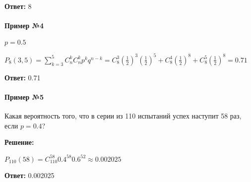 \documentclass{article}
\begin{document}
\textbf{Ответ:} 8

\paragraph{Пример №4}

$p = 0.5$

$P_{8}(3, 5) = \sum\limits_{k = 3}^{5} C_{n}^{k} C_{n}^{k} p^{k} q^{n - k} = C_{8}^{3} (\frac{1}{2})^{3} (\frac{1}{2})^{5} + C_{8}^{4} (\frac{1}{2})^{8} + C_{8}^{5} (\frac{1}{2})^{8} = 0.71$

\textbf{Ответ:} 0.71

\paragraph{Пример №5}

Какая вероятность того, что в серии из 110 испытаний успех наступит 58 раз, если $p = 0.4$?

\textbf{Решение:}

$P_{110}(58) = C_{110}^{58} 0.4^{58} 0.6^{52} \approx 0.002025$

\textbf{Ответ:} 0.002025
\end{document}
